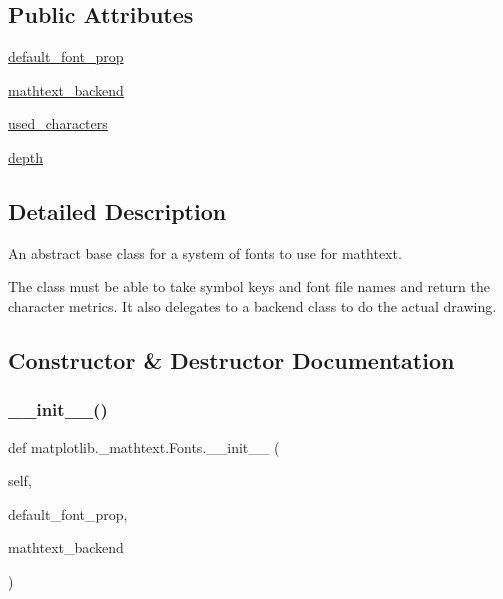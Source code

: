 \subsection*{Public Attributes}
\begin{DoxyCompactItemize}
\item 
\hyperlink{classmatplotlib_1_1__mathtext_1_1Fonts_a716114e691f32387590085aa0f7128ce}{default\+\_\+font\+\_\+prop}
\item 
\hyperlink{classmatplotlib_1_1__mathtext_1_1Fonts_a9742f1a6a11c8cf2ba8b0daddab0acec}{mathtext\+\_\+backend}
\item 
\hyperlink{classmatplotlib_1_1__mathtext_1_1Fonts_a08b1e97cfcf61c612bd827aeaf6cbfbe}{used\+\_\+characters}
\item 
\hyperlink{classmatplotlib_1_1__mathtext_1_1Fonts_a297c8b5ab1db0a3c9707a866561b344d}{depth}
\end{DoxyCompactItemize}


\subsection{Detailed Description}
\begin{DoxyVerb}An abstract base class for a system of fonts to use for mathtext.

The class must be able to take symbol keys and font file names and
return the character metrics.  It also delegates to a backend class
to do the actual drawing.
\end{DoxyVerb}
 

\subsection{Constructor \& Destructor Documentation}
\mbox{\label{classmatplotlib_1_1__mathtext_1_1Fonts_ad54dc7f42b0ee47accb66a4648d2f317}} 
\subsubsection{\texorpdfstring{\+\_\+\+\_\+init\+\_\+\+\_\+()}{\_\_init\_\_()}}
{\footnotesize\ttfamily def matplotlib.\+\_\+mathtext.\+Fonts.\+\_\+\+\_\+init\+\_\+\+\_\+ (\begin{DoxyParamCaption}\item[{}]{self,  }\item[{}]{default\+\_\+font\+\_\+prop,  }\item[{}]{mathtext\+\_\+backend }\end{DoxyParamCaption})}


